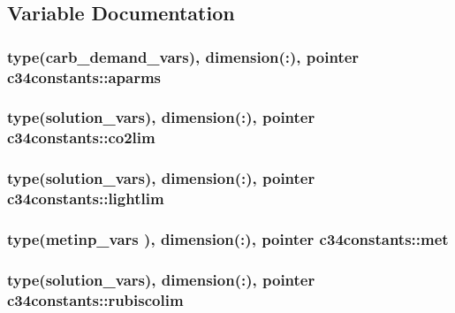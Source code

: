 \subsection{Variable Documentation}
\hypertarget{namespacec34constants_a844bf4288f019d9dcee7612f54d1e50c}{}
\subsubsection[{aparms}]{\setlength{\rightskip}{0pt plus 5cm}type({\bf carb\+\_\+demand\+\_\+vars}), dimension(\+:), pointer c34constants\+::aparms}\label{namespacec34constants_a844bf4288f019d9dcee7612f54d1e50c}
\hypertarget{namespacec34constants_abed7f7ff7745473ac53005a45206f506}{}
\subsubsection[{co2lim}]{\setlength{\rightskip}{0pt plus 5cm}type({\bf solution\+\_\+vars}), dimension(\+:), pointer c34constants\+::co2lim}\label{namespacec34constants_abed7f7ff7745473ac53005a45206f506}
\hypertarget{namespacec34constants_af66eea644957075da5a5285e735e143b}{}
\subsubsection[{lightlim}]{\setlength{\rightskip}{0pt plus 5cm}type({\bf solution\+\_\+vars}), dimension(\+:), pointer c34constants\+::lightlim}\label{namespacec34constants_af66eea644957075da5a5285e735e143b}
\hypertarget{namespacec34constants_a6d1c98b7c360f24d485be8fc38bdd284}{}
\subsubsection[{met}]{\setlength{\rightskip}{0pt plus 5cm}type({\bf metinp\+\_\+vars} ), dimension(\+:), pointer c34constants\+::met}\label{namespacec34constants_a6d1c98b7c360f24d485be8fc38bdd284}
\hypertarget{namespacec34constants_a54cb2e4894b639d22e50b457b4208cfc}{}
\subsubsection[{rubiscolim}]{\setlength{\rightskip}{0pt plus 5cm}type({\bf solution\+\_\+vars}), dimension(\+:), pointer c34constants\+::rubiscolim}\label{namespacec34constants_a54cb2e4894b639d22e50b457b4208cfc}
\hypertarget{namespacec34constants_a083891d928147a7252ada72b49b240a3}{}
